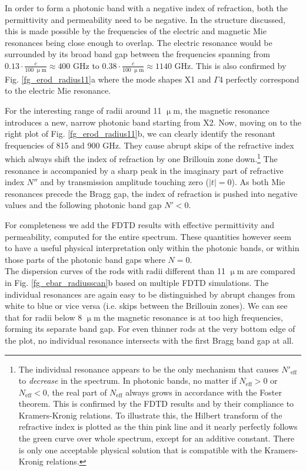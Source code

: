 {In order to form a photonic band with a negative index of refraction, both the permittivity and permeability need to be negative. In the structure discussed, this is made possible by the frequencies of the electric and magnetic Mie resonances being close enough to overlap.
The electric resonance would be surrounded by its broad band gap between the frequencies spanning from $0.13 \cdot\frac{c}{100\;\upmu\text{m}} \approx 400$ GHz to  $0.38 \cdot\frac{c}{100\;\upmu\text{m}} \approx 1140$ GHz. This is also confirmed by Fig. \ref{fg_erod_radius11}a where the mode shapes X1 and $\Gamma$4 perfectly correspond to the electric Mie resonance. 

For the interesting range of radii around 11 $\upmu$m, the magnetic resonance introduces a new, narrow photonic band starting from X2. Now, moving on to the right plot of Fig. \ref{fg_erod_radius11}b, we can clearly identify the resonant frequencies of 815 and 900 GHz. They cause abrupt skips of the refractive index which always shift the index of refraction by one Brillouin zone down.\footnote{The individual resonance appears to be the only mechanism that causes $N'_{\text{eff}}$ to \textit{decrease} in the spectrum. In photonic bands, no matter if $N_{\text{eff}} > 0$  or $N_{\text{eff}} < 0$, the real part of $N_{\text{eff}}$ always grows in accordance with the Foster theorem. This is confirmed by the FDTD results and by their compliance to Kramers-Kronig relations. To illustrate this, the Hilbert transform of the refractive index is plotted as the thin pink line and it nearly perfectly follows the green curve over whole spectrum, except for an additive constant. There is  only one acceptable physical solution that is compatible with the Kramers-Kronig relations.}
The resonance is accompanied by a sharp peak in the imaginary part of refractive index $N''$ and by transmission amplitude touching zero ($|t| = 0$). As both Mie resonances precede the Bragg gap, the index of refraction is pushed into negative values and the following photonic band gap $N' < 0$.

For completeness we add the FDTD results with effective permittivity and permeability, computed for the entire spectrum. These quantities however seem to have a useful physical interpretation only within the photonic bands, or within those parts of the photonic band gaps where $N = 0$. 
\\

The dispersion curves of the rods with radii different than 11 $\upmu$m are compared in Fig. \ref{fg_ebar_radiusscan}b based on multiple FDTD simulations. The individual resonances are again easy to be distinguished by abrupt changes from white to blue or vice versa (i.e. skips between the Brillouin zones). We can see that for radii below 8 $\upmu$m the magnetic resonance is at too high frequencies, forming its separate band gap. For even thinner rods at the very bottom edge of the plot, no individual resonance intersects with the first Bragg  band gap at all. 

}
